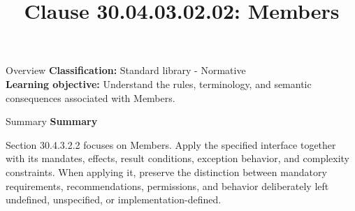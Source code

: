 \documentclass[10pt,letterpaper]{article}
\title{Clause 30.04.03.02.02: Members}
\author{}
\date{}
\begin{document}
\maketitle
\begin{CornellOverviewBox}{Overview}
\textbf{Classification:} Standard library - Normative\\[2pt]
\textbf{Learning objective:} Understand the rules, terminology, and semantic consequences associated with Members.
\end{CornellOverviewBox}\begin{CornellSummaryBox}{Summary}
{\sffamily\bfseries\color{Accent} Summary}\par\vspace{3pt}Section 30.4.3.2.2 focuses on Members. Apply the specified interface together with its mandates, effects, result conditions, exception behavior, and complexity constraints. When applying it, preserve the distinction between mandatory requirements, recommendations, permissions, and behavior deliberately left undefined, unspecified, or implementation-defined.
\end{CornellSummaryBox}
\end{document}
